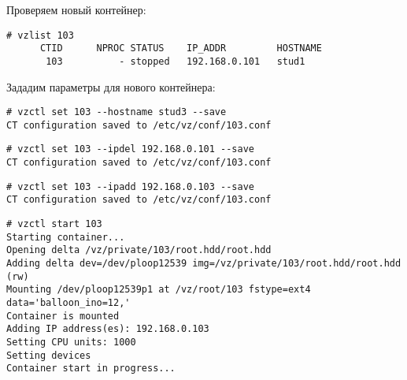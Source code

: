 Проверяем новый контейнер:
\begin{lstlisting}
# vzlist 103
      CTID      NPROC STATUS    IP_ADDR         HOSTNAME
       103          - stopped   192.168.0.101   stud1
\end{lstlisting}

Зададим параметры для нового контейнера:
\begin{lstlisting}
# vzctl set 103 --hostname stud3 --save
CT configuration saved to /etc/vz/conf/103.conf
\end{lstlisting}
\begin{lstlisting}
# vzctl set 103 --ipdel 192.168.0.101 --save
CT configuration saved to /etc/vz/conf/103.conf
\end{lstlisting}
\begin{lstlisting}
# vzctl set 103 --ipadd 192.168.0.103 --save
CT configuration saved to /etc/vz/conf/103.conf
\end{lstlisting}

\begin{lstlisting}
# vzctl start 103
Starting container...
Opening delta /vz/private/103/root.hdd/root.hdd
Adding delta dev=/dev/ploop12539 img=/vz/private/103/root.hdd/root.hdd (rw)
Mounting /dev/ploop12539p1 at /vz/root/103 fstype=ext4 data='balloon_ino=12,' 
Container is mounted
Adding IP address(es): 192.168.0.103
Setting CPU units: 1000
Setting devices
Container start in progress...
\end{lstlisting}

\clearpage
